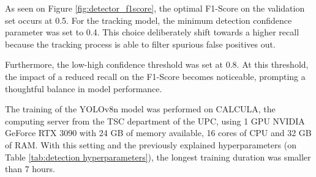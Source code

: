 {
	As seen on Figure \ref{fig:detector_f1score}, the optimal F1-Score on the validation set occurs at 0.5. 
    For the tracking model, the minimum detection confidence parameter was set to 0.4. 
    This choice deliberately shift towards a higher recall because the tracking process is able to filter spurious false positives out.
}

{
    Furthermore, the low-high confidence threshold was set at 0.8. 
    At this threshold, the impact of a reduced recall on the F1-Score becomes noticeable, prompting a thoughtful balance in model performance.
}

{
    The training of the \ac{YOLOv8n} model was performed on CALCULA, the computing server from the \ac{TSC} department of the \ac{UPC}, using 1 GPU NVIDIA GeForce RTX 3090 with 24 GB of memory available, 16 cores of CPU and 32 GB of RAM. With this setting and the previously explained hyperparameters (on Table \ref{tab:detection hyperparameters}), the longest training duration was smaller than 7 hours.
}

